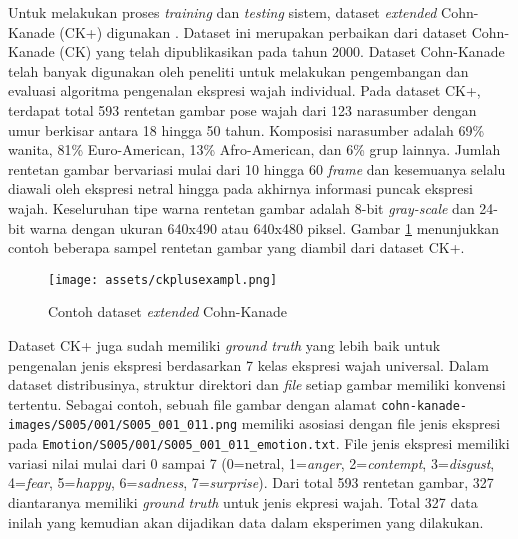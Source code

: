 \documentclass[review,3p,12pt,times]{elsarticle}
\begin{document}
Untuk melakukan proses \textit{training} dan \textit{testing} sistem, dataset \textit{extended} Cohn-Kanade (CK+) digunakan \cite{lucey2010extended}. Dataset ini merupakan perbaikan dari dataset Cohn-Kanade (CK) yang telah dipublikasikan pada tahun 2000. Dataset Cohn-Kanade telah banyak digunakan oleh peneliti untuk melakukan pengembangan dan evaluasi algoritma pengenalan ekspresi wajah individual. Pada dataset CK+, terdapat total 593 rentetan gambar pose wajah dari 123 narasumber dengan umur berkisar antara 18 hingga 50 tahun. Komposisi narasumber adalah 69\% wanita, 81\% Euro-American, 13\% Afro-American, dan 6\% grup lainnya. Jumlah rentetan gambar bervariasi mulai dari 10 hingga 60 \textit{\textit{frame}} dan kesemuanya selalu diawali oleh ekspresi netral hingga pada akhirnya informasi puncak ekspresi wajah. Keseluruhan tipe warna rentetan gambar adalah 8-bit \textit{gray-scale} dan 24-bit warna dengan ukuran 640x490 atau 640x480 piksel. Gambar \ref{fig:ckplusexampl} menunjukkan contoh beberapa sampel rentetan gambar yang diambil dari dataset CK+.

\begin{figure}[b!]
\caption{Contoh dataset \textit{extended} Cohn-Kanade}
\label{fig:ckplusexampl}
\centering
	\texttt{[image: assets/ckplusexampl.png]}
	
\end{figure}

Dataset CK+ juga sudah memiliki \textit{ground truth} yang lebih baik untuk pengenalan jenis ekspresi berdasarkan 7 kelas ekspresi wajah universal. Dalam dataset distribusinya, struktur direktori dan \textit{file} setiap gambar memiliki konvensi tertentu. Sebagai contoh, sebuah file gambar dengan alamat \texttt{cohn-kanade-images/S005/001/S005\_001\_011.png} memiliki asosiasi dengan file jenis ekspresi pada \texttt{Emotion/S005/001/S005\_001\_011\_emotion.txt}. File jenis ekspresi memiliki variasi nilai mulai dari 0 sampai 7 (0=netral, 1=\textit{anger}, 2=\textit{contempt}, 3=\textit{disgust}, 4=\textit{fear}, 5=\textit{happy}, 6=\textit{sadness}, 7=\textit{surprise}). Dari total 593 rentetan gambar, 327 diantaranya memiliki \textit{ground truth} untuk jenis ekpresi wajah. Total 327 data inilah yang kemudian akan dijadikan data dalam eksperimen yang dilakukan.

\end{document}
